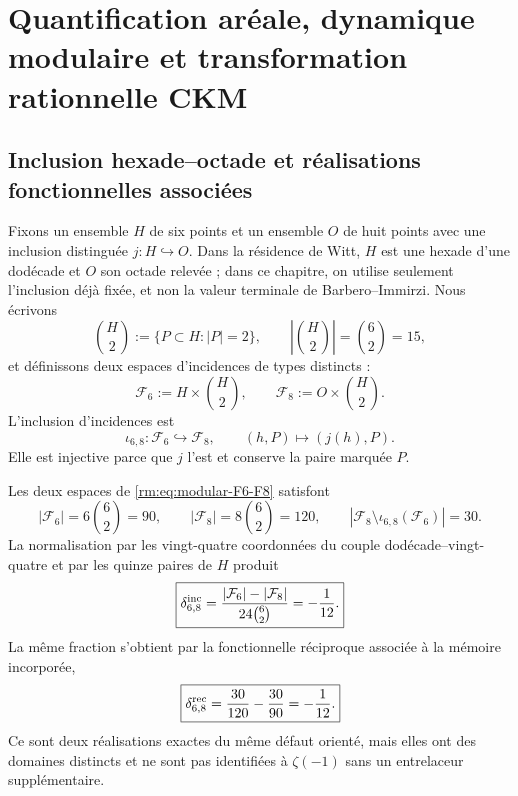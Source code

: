 \section{Quantification aréale, dynamique modulaire et transformation rationnelle CKM}
\label{rm:ch:modular}

\subsection{Inclusion hexade--octade et réalisations fonctionnelles associées}

Fixons un ensemble \(H\) de six points et un ensemble \(O\) de huit
points avec une inclusion distinguée \(j:H\hookrightarrow O\). Dans la
résidence de Witt, \(H\) est une hexade d'une dodécade et \(O\) son octade
relevée ; dans ce chapitre, on utilise seulement l'inclusion déjà fixée, et non la
valeur terminale de Barbero--Immirzi. Nous écrivons
\begin{equation}
\label{rm:eq:modular-pairs-H}
\binom H2:=\{P\subset H:|P|=2\},
\qquad \left|\binom H2\right|=\binom62=15,
\end{equation}
et définissons deux espaces d'incidences de types distincts :
\begin{equation}
\label{rm:eq:modular-F6-F8}
\mathcal F_6:=H\times\binom H2,
\qquad
\mathcal F_8:=O\times\binom H2.
\end{equation}
L'inclusion d'incidences est
\begin{equation}
\label{rm:eq:modular-iota68}
\iota_{6,8}:\mathcal F_6\hookrightarrow\mathcal F_8,
\qquad
(h,P)\longmapsto(j(h),P).
\end{equation}
Elle est injective parce que \(j\) l'est et conserve la paire marquée \(P\).

\begin{theorem}
\label{rm:thm:modular-incidence-90-120}
Les deux espaces de \cref{rm:eq:modular-F6-F8} satisfont
\begin{equation}
\label{rm:eq:modular-counts-90-120}
|\mathcal F_6|=6\binom62=90,
\qquad
|\mathcal F_8|=8\binom62=120,
\qquad
|\mathcal F_8\setminus\iota_{6,8}(\mathcal F_6)|=30.
\end{equation}
La normalisation par les vingt-quatre coordonnées du couple
dodécade--vingt-quatre et par les quinze paires de \(H\) produit
\begin{equation}
\label{rm:eq:modular-incidence-defect}
\boxed{
\delta_{6,8}^{\rm inc}
=\frac{|\mathcal F_6|-|\mathcal F_8|}
{24\binom62}=-\frac1{12}.}
\end{equation}
La même fraction s'obtient par la fonctionnelle réciproque associée
à la mémoire incorporée,
\begin{equation}
\label{rm:eq:modular-reciprocal-defect}
\boxed{
\delta_{6,8}^{\rm rec}
=\frac{30}{120}-\frac{30}{90}=-\frac1{12}.}
\end{equation}
Ce sont deux réalisations exactes du même défaut orienté, mais elles ont
des domaines distincts et ne sont pas identifiées à \(\zeta(-1)\) sans un
entrelaceur supplémentaire.
\end{theorem}

